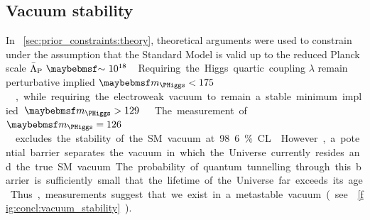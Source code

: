 \subsection{Vacuum stability}
\label{sec:implications:vacuum}

In \Section~\ref{sec:prior_constraints:theory}, theoretical arguments were used to 
constrain \mH under the assumption that the Standard Model is valid up to the reduced 
Planck scale \unit{$\bar{\Lambda}_{\text{P}}~\about~10^{18}$}{\GeV}. Requiring the Higgs 
quartic coupling $\lambda$ remain perturbative implied \unit{$\mH < 175$}{\GeV}, while 
requiring the electroweak vacuum to remain a stable minimum implied 
\unit{$\mH > 129$}{\GeV} \cite{Ellis:2009}. 

The measurement of \unit{$\mH = 126$}{\GeV} excludes the stability of the SM vacuum at 
98.6\% CL \cite{Degrassi:vacuum}. However, a potential barrier separates the vacuum in 
which the Universe currently resides and the true SM vacuum. The probability of quantum 
tunnelling through this barrier is sufficiently small that the lifetime of the Universe 
far exceeds its age. Thus, measurements suggest that we exist in a metastable vacuum (see 
\Figure~\ref{fig:concl:vacuum_stability}).

